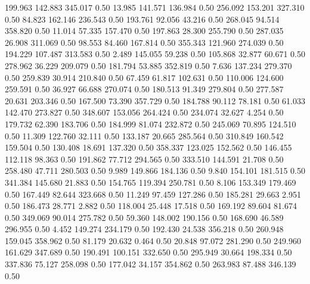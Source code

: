  199.963  142.883  345.017         0.50
  13.985  141.571  136.984         0.50
 256.092  153.201  327.310         0.50
  84.823  162.146  236.543         0.50
 193.761   92.056   43.216         0.50
 268.045   94.514  358.820         0.50
  11.014   57.335  157.470         0.50
 197.863   28.300  255.790         0.50
 287.035   26.908  311.069         0.50
  98.553   84.460  167.814         0.50
 355.343  121.960  274.039         0.50
 194.229  107.487  313.583         0.50
   2.489  145.055   59.238         0.50
 105.868   32.877   60.671         0.50
 278.962   36.229  209.079         0.50
 181.794   53.885  352.819         0.50
   7.636  137.234  279.370         0.50
 259.839   30.914  210.840         0.50
  67.459   61.817  102.631         0.50
 110.006  124.600  259.591         0.50
  36.927   66.688  270.074         0.50
 180.513   91.349  279.804         0.50
 277.587   20.631  203.346         0.50
 167.500   73.390  357.729         0.50
 184.788   90.112   78.181         0.50
  61.033  142.470  273.827         0.50
 348.607  153.056  264.424         0.50
 234.074   32.627    4.254         0.50
 179.732   62.390  183.706         0.50
 184.999   81.074  232.872         0.50
 245.069   70.895  124.510         0.50
  11.309  122.760   32.111         0.50
 133.187   20.665  285.564         0.50
 310.849  160.542  159.504         0.50
 130.408   18.691  137.320         0.50
 358.337  123.025  152.562         0.50
 146.455  112.118   98.363         0.50
 191.862   77.712  294.565         0.50
 333.510  144.591   21.708         0.50
 258.480   47.711  280.503         0.50
   9.989  149.866  184.136         0.50
   9.840  154.101  181.515         0.50
 341.384  145.680   21.883         0.50
 154.765  119.394  250.781         0.50
   8.106  153.349  179.469         0.50
 167.449   82.644  323.668         0.50
  11.249   97.459  127.286         0.50
 185.281   29.663    2.951         0.50
 186.473   28.771    2.882         0.50
 118.004   25.448   17.518         0.50
 169.192   89.604   81.674         0.50
 349.069   90.014  275.782         0.50
  59.360  148.002  190.156         0.50
 168.690   46.589  296.955         0.50
   4.452  149.274  234.179         0.50
 192.430   24.538  356.218         0.50
 260.948  159.045  358.962         0.50
  81.179   20.632    0.464         0.50
  20.848   97.072  281.290         0.50
 249.960  161.629  347.689         0.50
 190.491  100.151  332.650         0.50
 295.949   30.664  198.334         0.50
 337.836   75.127  258.098         0.50
 177.042   34.157  354.862         0.50
 263.983   87.488  346.139         0.50
